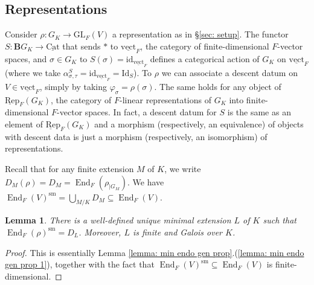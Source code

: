 \documentclass[a4paper,10pt]{amsart}
\theoremstyle{plain}
\newtheorem{lemma}[theorem]{Lemma}
\theoremstyle{definition}
\theoremstyle{remark}
\def\GL{\mathrm{GL}}
\def\ul#1{\underline{#1}}
\def\mr#1{\mathrm{#1}}
\def\Bbf{\mathbf{B}}
\def\Rep{\underline{\mathrm{Re}}\mathrm{p}}
\def\vect{\underline{\mathrm{vect}}}
\DeclareMathOperator{\End}{End}
\newcommand{\lorenzo}[1]{{\color{blue}[Lorenzo: #1]}}
\begin{document}
\subsection{Representations}\label{ssec: cat action on reps}
Consider \(\rho \colon G_K \to \GL_F(V)\) a representation as in \S\ref{sec: setup}.
The functor \(S \colon \Bbf G_K \to \ul{\mr{Cat}}\) that sends \(\ast\) to \(\vect_F\), the category of finite-dimensional \(F\)-vector spaces, and \(\sigma \in G_K\) to \(S(\sigma)= \mr{id}_{\vect_F}\) defines a categorical action of \(G_K\) on \(\vect_F\) (where we take \(\alpha_{\sigma, \tau}^S = \mr{id}_{\vect_F} = \mr{Id}_S\)). To \(\rho\) we can associate a descent datum on \(V \in \vect_F\), simply by taking \(\varphi_\sigma = \rho(\sigma)\). The same holds for any object of \(\Rep_F(G_K)\), the category of \(F\)-linear representations of \(G_K\) into finite-dimensional \(F\)-vector spaces. In fact, a descent datum for \(S\) is the same as an element of \(\Rep_F(G_K)\) and a morphism (respectively, an equivalence) of objects with descent data is just a morphism (respectively, an isomorphism) of representations.

Recall that for any finite extension \(M\) of \(K\), we write \(D_M(\rho) = D_M = \End_{F}(\rho_{|G_M})\). We have \(\End_F(V)^\mr{sm} = \bigcup_{M/K} D_M \subseteq \End_F(V)\).
\begin{lemma}\label{lemma: exist min endo field}
There is a well-defined unique minimal extension \(L\) of \(K\) such that \(\End_F(\rho)^\mr{sm} = D_L\). Moreover, \(L\) is finite and Galois over \(K\).
\end{lemma}

\begin{proof}
This is essentially Lemma \ref{lemma: min endo gen prop}.(\ref{lemma: min endo gen prop 1}), together with the fact that \(\End_F(V)^\mr{sm} \subseteq \End_F(V)\) is finite-dimensional.
\end{proof}
\end{document}
